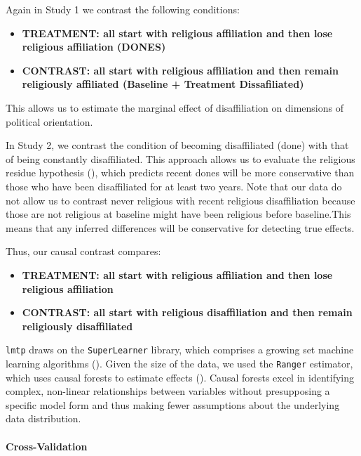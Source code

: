 \documentclass[
  singlecolumn]{article}
\let\oldparagraph\paragraph
\renewcommand{\paragraph}[1]{\oldparagraph{#1}\mbox{}}
\begin{document}
Again in Study 1 we contrast the following conditions:

\begin{itemize}
\item
  \textbf{TREATMENT: all start with religious affiliation and then lose
  religious affiliation (DONES)}
\item
  \textbf{CONTRAST: all start with religious affiliation and then remain
  religiously affiliated (Baseline + Treatment Dissafiliated) }
\end{itemize}

This allows us to estimate the marginal effect of disaffiliation on
dimensions of political orientation.

In Study 2, we contrast the condition of becoming disaffiliated (done)
with that of being constantly disaffiliated. This approach allows us to
evaluate the religious residue hypothesis
(), which
predicts recent dones will be more conservative than those who have been
disaffiliated for at least two years. Note that our data do not allow us
to contrast never religious with recent religious disaffiliation because
those are not religious at baseline might have been religious before
baseline.This means that any inferred differences will be conservative
for detecting true effects.

Thus, our causal contrast compares:

\begin{itemize}
\item
  \textbf{TREATMENT: all start with religious affiliation and then lose
  religious affiliation}
\item
  \textbf{CONTRAST: all start with religious disaffiliation and then
  remain religiously disaffiliated}
\end{itemize}

\texttt{lmtp} draws on the \texttt{SuperLearner} library, which
comprises a growing set machine learning algorithms
(). Given the
size of the data, we used the \texttt{Ranger} estimator, which uses
causal forests to estimate effects (). Causal forests excel in identifying complex, non-linear
relationships between variables without presupposing a specific model
form and thus making fewer assumptions about the underlying data
distribution.

\paragraph{Cross-Validation}\label{cross-validation}
\end{document}
